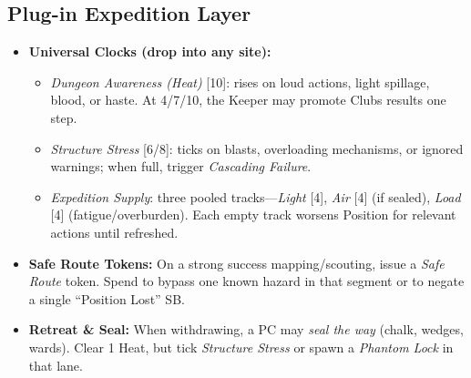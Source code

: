 \subsection*{Plug-in Expedition Layer}
\begin{itemize}
  \item \textbf{Universal Clocks (drop into any site):}
    \begin{itemize}
      \item \emph{Dungeon Awareness (Heat)} [10]: rises on loud actions, light spillage, blood, or haste. At 4/7/10, the Keeper may promote Clubs results one step.
      \item \emph{Structure Stress} [6/8]: ticks on blasts, overloading mechanisms, or ignored warnings; when full, trigger \emph{Cascading Failure}.
      \item \emph{Expedition Supply}: three pooled tracks—\emph{Light} [4], \emph{Air} [4] (if sealed), \emph{Load} [4] (fatigue/overburden). Each empty track worsens Position for relevant actions until refreshed.
    \end{itemize}
  \item \textbf{Safe Route Tokens:} On a strong success mapping/scouting, issue a \emph{Safe Route} token. Spend to bypass one known hazard in that segment or to negate a single “Position Lost” SB.
  \item \textbf{Retreat \& Seal:} When withdrawing, a PC may \emph{seal the way} (chalk, wedges, wards). Clear 1 Heat, but tick \emph{Structure Stress} or spawn a \emph{Phantom Lock} in that lane.
\end{itemize}

